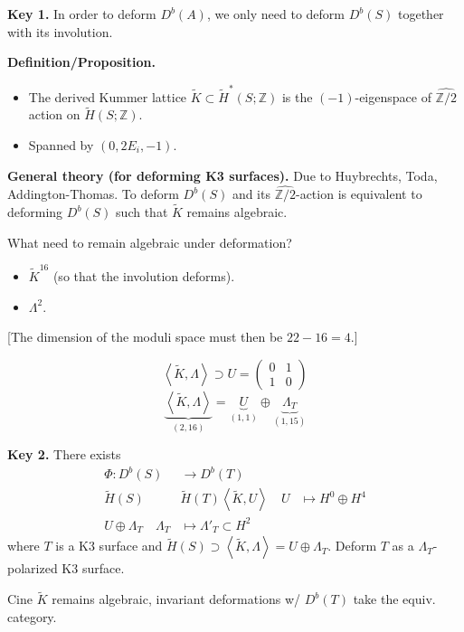 \medskip\noindent
{\bf Key 1.} In order to deform $D^b(A)$, we only need to deform
$D^b(S)$ together with its involution.

\medskip\noindent
{\bf Definition/Proposition.} 
\begin{itemize}
\item The derived Kummer lattice $\tilde{K}\subset\tilde{H}^*(S;\mathbb{Z})$ 
is the $(-1)$-eigenspace of $\widehat{\mathbb{Z}/2}$ action on
$\tilde{H}(S;\mathbb{Z})$.
\item Spanned by $(0,2E_i,-1)$.
\end{itemize}

\medskip\noindent
{\bf General theory (for deforming K3 surfaces).} Due to Huybrechts, Toda,
Addington-Thomas. To deform $D^b(S)$ and its $\widehat{\mathbb{Z}/2}$-action is
equivalent to deforming $D^b(S)$ such that $\tilde{K}$ remains algebraic.

What need to remain algebraic under deformation?
\begin{itemize}
\item $\tilde{K}^{16}$ (so that the involution deforms).
\item $\Lambda^2$.
\end{itemize}
[The dimension of the moduli space must then be $22-16=4$.]

\begin{lemma}
\label{lemma-}
$$
\left<\tilde{K},\Lambda\right>\supset U=\begin{pmatrix}
0&1\\ 
1&0
\end{pmatrix}
$$
$$
\underbrace{\left<\tilde{K},\Lambda\right>}_{(2,16)}
=\underbrace{U}_{(1,1)}\oplus\underbrace{\Lambda_T}_{(1,15)}
$$
\end{lemma}

\medskip\noindent
{\bf Key 2.} There exists
\begin{align*}
\Phi: D^b(S) &\longrightarrow D^b(T) \\
\tilde{H}(S) & \tilde{H}(T)
\left<\tilde{K}, U\right>\quad U &\longmapsto H^0 \oplus H^4\\
U \oplus \Lambda_T\quad \Lambda_T &\longmapsto \Lambda'_T \subset H^2
\end{align*}
where $ T$ is a K3 surface and $\tilde{H}(S) \supset \left<
\tilde{K},\Lambda\right>=U\oplus \Lambda_T$. Deform $T$ as a
$\Lambda_T$-polarized K3 surface.

Cine $\tilde{K}$ remains algebraic, invariant deformations w/ $D^b(T)$ take
the equiv. category.

